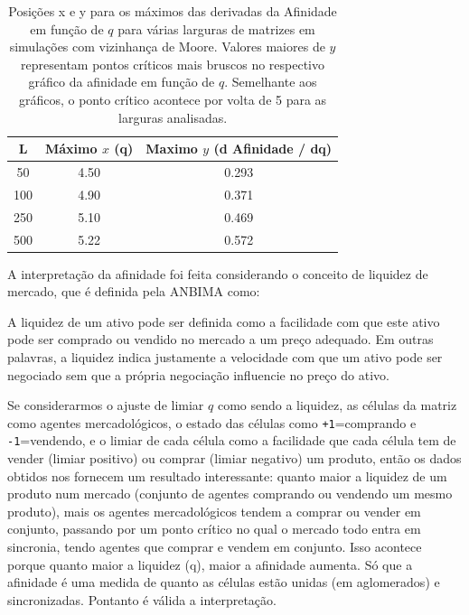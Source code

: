 \documentclass[
	12pt,				%
	openright,			%
	twoside,			%
	a4paper,			%
	english,			%
	french,				%
	spanish,			%
	brazil				%
	]{abntex2}
\begin{document}
\begin{table}
  \centering
  \caption{Posições x e y para os máximos das derivadas da Afinidade em função de $q$ para várias larguras de matrizes em simulações com vizinhança de Moore. Valores maiores de $y$ representam pontos críticos mais bruscos no respectivo gráfico da afinidade em função de $q$. Semelhante aos gráficos, o ponto crítico acontece por volta de 5 para as larguras analisadas.}
  \label{tab:maximosAfinidadeMoore}
  \begin{tabular}{ccc}\toprule
    L	& Máximo $x$ (q)	& Maximo $y$ (d Afinidade / dq)\\\midrule\midrule
    50	& 4.50	& 0.293\\
    100	& 4.90	& 0.371\\
    250	& 5.10	& 0.469\\
    500	& 5.22	& 0.572\\\bottomrule
  \end{tabular}
\end{table}

A interpretação da afinidade foi feita considerando o conceito de liquidez de mercado, que é definida pela ANBIMA \cite{anbima4} como:
\begin{citacao}
  A liquidez de um ativo pode ser definida como a facilidade com que este ativo pode ser
comprado ou vendido no mercado a um preço adequado. Em outras palavras, a liquidez indica
justamente a velocidade com que um ativo pode ser negociado sem que a própria negociação
influencie no preço do ativo. \cite{anbima4}
\end{citacao}

Se considerarmos o ajuste de limiar $q$ como sendo a liquidez, as células da matriz como agentes mercadológicos, o estado das células como \texttt{+1}=comprando e \texttt{-1}=vendendo, e o limiar de cada célula como a facilidade que cada célula tem de vender (limiar positivo) ou comprar (limiar negativo) um produto, então os dados obtidos nos fornecem um resultado interessante: quanto maior a liquidez de um produto num mercado (conjunto de agentes comprando ou vendendo um mesmo produto), mais os agentes mercadológicos tendem a comprar ou vender em conjunto, passando por um ponto crítico no qual o mercado todo entra em sincronia, tendo agentes que comprar e vendem em conjunto. Isso acontece porque quanto maior a liquidez (q), maior a afinidade aumenta. Só que a afinidade é uma medida de quanto as células estão unidas (em aglomerados) e sincronizadas. Pontanto é válida a interpretação.
\end{document}
